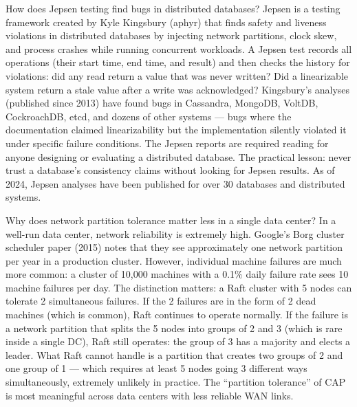 \documentclass[11pt,a4paper]{article}
\begin{document}
\begin{curiobox}{How does Jepsen testing find bugs in distributed databases?}
Jepsen is a testing framework created by Kyle Kingsbury (aphyr) that finds safety and liveness violations in distributed databases by injecting network partitions, clock skew, and process crashes while running concurrent workloads. A Jepsen test records all operations (their start time, end time, and result) and then checks the history for violations: did any read return a value that was never written? Did a linearizable system return a stale value after a write was acknowledged? Kingsbury's analyses (published since 2013) have found bugs in Cassandra, MongoDB, VoltDB, CockroachDB, etcd, and dozens of other systems --- bugs where the documentation claimed linearizability but the implementation silently violated it under specific failure conditions. The Jepsen reports are required reading for anyone designing or evaluating a distributed database. The practical lesson: never trust a database's consistency claims without looking for Jepsen results. As of 2024, Jepsen analyses have been published for over 30 databases and distributed systems.
\end{curiobox}

\begin{curiobox}{Why does network partition tolerance matter less in a single data center?}
In a well-run data center, network reliability is extremely high. Google's Borg cluster scheduler paper (2015) notes that they see approximately one network partition per year in a production cluster. However, individual machine failures are much more common: a cluster of 10,000 machines with a 0.1\% daily failure rate sees 10 machine failures per day. The distinction matters: a Raft cluster with 5 nodes can tolerate 2 simultaneous failures. If the 2 failures are in the form of 2 dead machines (which is common), Raft continues to operate normally. If the failure is a network partition that splits the 5 nodes into groups of 2 and 3 (which is rare inside a single DC), Raft still operates: the group of 3 has a majority and elects a leader. What Raft cannot handle is a partition that creates two groups of 2 and one group of 1 --- which requires at least 5 nodes going 3 different ways simultaneously, extremely unlikely in practice. The ``partition tolerance'' of CAP is most meaningful across data centers with less reliable WAN links.
\end{curiobox}

\end{document}
